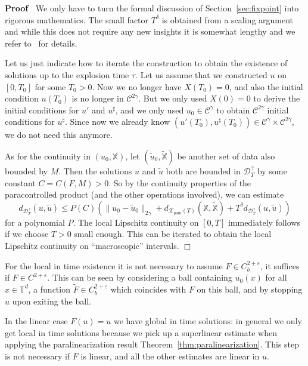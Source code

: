 \documentclass[a4paper,11pt]{article}
\newcommand{\tmop}[1]{\ensuremath{\operatorname{#1}}}
\newenvironment{proof}{\noindent\textbf{Proof\ }}{\hspace*{\fill}$\Box$\medskip}
\newcommand{\CC}{\mathscr{C}}
\newcommand{\CD}{\mathscr{D}}
\begin{document}
\begin{proof}
  We only have to turn the formal discussion of Section~\ref{sec:fixpoint}
  into rigorous mathematics. The small factor $T^{\delta}$ is obtained from a
  scaling argument and while this does not require any new insights it is
  somewhat lengthy and we refer to~{\cite{Gubinelli2012,Gubinelli2014}} for
  details.
  
  Let us just indicate how to iterate the construction to obtain the existence
  of solutions up to the explosion time $\tau$. Let us assume that we
  constructed $u$ on $[0, T_0]$ for some $T_0 > 0$. Now we no longer have $X
  (T_0) = 0$, and also the initial condition $u (T_0)$ is no longer in $\CC^{2
  \gamma}$. But we only used $X (0) = 0$ to derive the initial conditions for
  $u'$ and $u^{\sharp}$, and we only used $u_0 \in \CC^{\gamma}$ to obtain
  $\CC^{2 \gamma}$ initial conditions for $u^{\sharp}$. Since now we already
  know $(u' (T_0), u^{\sharp} (T_0)) \in \CC^{\gamma} \times \CC^{2 \gamma}$,
  we do not need this anymore.
  
  As for the continuity in $(u_0, \mathbb{X})$, let $(\tilde{u}_0,
  \tilde{\mathbb{X}})$ be another set of data also bounded by $M$. Then the
  solutions $u$ and $\tilde{u}$ both are bounded in $\CD^{\gamma}_T$ by some
  constant $C = C (F, M) > 0$. So by the continuity properties of the
  paracontrolled product (and the other operations involved), we can estimate
  \[ d_{\CD^{\gamma}_T} (u, \tilde{u}) \leqslant P (C) \left( \| u_0 -
     \tilde{u}_0 \|_{2 \gamma} + d_{\mathcal{X}_{\tmop{pam}} (T)}
     (\mathbb{X}, \tilde{\mathbb{X}}) + T^{\delta} d_{\CD^{\gamma}_T} (u,
     \tilde{u}) \right) \]
  for a polynomial $P$. The local Lipschitz continuity on $[0, T]$ immediately
  follows if we choose $T > 0$ small enough. This can be iterated to obtain
  the local Lipschitz continuity on ``macroscopic'' intervals. 
\end{proof}

\begin{remark}
  For the local in time existence it is not necessary to assume $F \in C^{2 +
  \varepsilon}_b$, it suffices if $F \in C^{2 + \varepsilon}$. This can be
  seen by considering a ball containing $u_0 (x)$ for all $x \in
  \mathbb{T}^d$, a function $\tilde{F} \in C^{2 + \varepsilon}_b$ which
  coincides with $F$ on this ball, and by stopping $u$ upon exiting the ball.
  
  In the linear case $F (u) = u$ we have global in time solutions: in general
  we only get local in time solutions because we pick up a superlinear
  estimate when applying the paralinearization result
  Theorem~\ref{thm:paralinearization}. This step is not necessary if $F$ is
  linear, and all the other estimates are linear in $u$. 
\end{remark}
\end{document}
